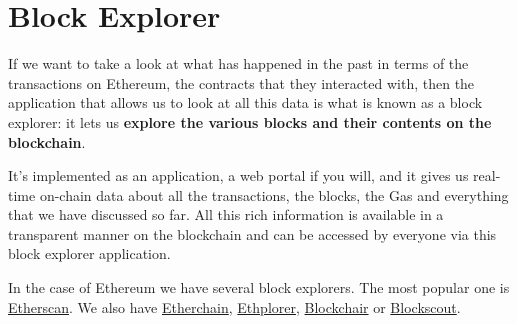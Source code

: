 \section{Block Explorer}\label{block-explorer}

If we want to take a look at what has happened in the past in terms of
the transactions on Ethereum, the contracts that they interacted with,
then the application that allows us to look at all this data is what is
known as a block explorer: it lets us \textbf{explore the various blocks
and their contents on the blockchain}.

It's implemented as an application, a web portal if you will, and it
gives us real-time on-chain data about all the transactions, the blocks,
the Gas and everything that we have discussed so far. All this rich
information is available in a transparent manner on the blockchain and
can be accessed by everyone via this block explorer application.

In the case of Ethereum we have several block explorers. The most
popular one is \href{https://etherscan.io/}{Etherscan}. We also have
\href{https://etherchain.org/}{Etherchain},
\href{https://ethplorer.io/}{Ethplorer},
\href{https://blockchair.com/}{Blockchair} or
\href{https://blockscout.com/}{Blockscout}.
